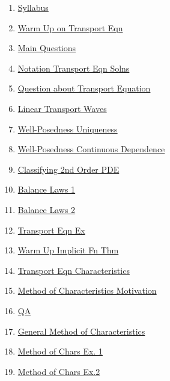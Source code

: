 \documentclass[11pt]{article}
\begin{document}
\begin{multicols}{2}
	\begin{enumerate}
		\item  \href{https://mp.weixin.qq.com/s/mUgu_mFWzy-ABDtZT20Tdg}{Syllabus} %
		\item  \href{https://mp.weixin.qq.com/s/OUJn5JEQguwzWtV_QuKR7g}{Warm Up on Transport Eqn} %
		\item  \href{https://mp.weixin.qq.com/s/ToiV8pA6BwYrB_UE8UQyxw}{Main Questions} %
		\item  \href{https://mp.weixin.qq.com/s/Tb4d6sJdCJEnUxmoFayuXA}{Notation Transport Eqn Solns} %
		\item  \href{https://mp.weixin.qq.com/s/teE8ahqg7sHksiKDwhhyvQ}{Question about Transport Equation} %
		\item  \href{https://mp.weixin.qq.com/s/KuCON_xzPYB1mey1dkA3iw}{Linear Transport Waves} %
		\item  \href{https://mp.weixin.qq.com/s/EgiiWDi9O5tXtUaCNWbmTQ}{Well-Posedness Uniqueness} %
		\item  \href{https://mp.weixin.qq.com/s/hT237fybR5iIjmmIHBv8Mw}{Well-Posedness Continuous Dependence} %
		\item  \href{https://mp.weixin.qq.com/s/sKQZVvWlLOJnKKZatkbaAw}{Classifying 2nd Order PDE} %
		\item  \href{https://mp.weixin.qq.com/s/w8cXOj7RQL4UmPosmm2wFQ}{Balance Laws 1} %
		\item  \href{https://mp.weixin.qq.com/s/s89OuzPw1T0Cl7zAGS9uJQ}{Balance Laws 2} %
		\item  \href{https://mp.weixin.qq.com/s/iM9Fou_V-wQeBR1o0_TWkw}{Transport Eqn Ex} %
		\item  \href{https://mp.weixin.qq.com/s/fDTnlHWcMsFASbzgL6actA}{Warm Up Implicit Fn Thm} %
		\item  \href{https://mp.weixin.qq.com/s/8UQd1Y9k17MUAGfjiPRYOQ}{Transport Eqn Characteristics} %
		\item  \href{https://mp.weixin.qq.com/s/t2QkzuqKlAMe16AeiQea6Q}{Method of Characteristics Motivation} %
		\item  \href{https://mp.weixin.qq.com/s/5wxW8QxgliujAAsRawxA2g}{QA} %
		\item  \href{https://mp.weixin.qq.com/s/D81VzorX8iXBl3zm0lQMIw}{General Method of Characteristics} %
		\item  \href{https://mp.weixin.qq.com/s/zICtf6KA72cZo6WBbFtNzA}{Method of Chars Ex. 1} %
		\item  \href{https://mp.weixin.qq.com/s/L28crR0iuNuXfk2k_hw79Q}{Method of Chars Ex.2} %

\end{enumerate}
\end{multicols}
\end{document}
